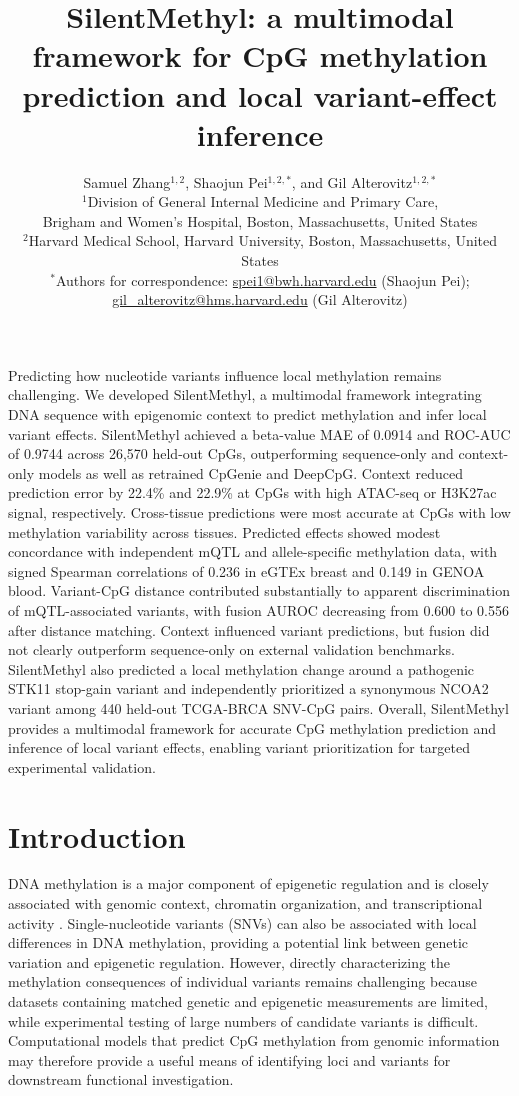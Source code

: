 \documentclass[11pt,letterpaper]{article}
\title{\LARGE\bfseries SilentMethyl: a multimodal framework for CpG methylation prediction and local variant-effect inference}
\author{%
  Samuel Zhang$^{1,2}$, Shaojun Pei$^{1,2,*}$, and Gil Alterovitz$^{1,2,*}$ \\[0.5em]
  \small $^{1}$Division of General Internal Medicine and Primary Care, \\
  \small Brigham and Women's Hospital, Boston, Massachusetts, United States \\
  \small $^{2}$Harvard Medical School, Harvard University, Boston, Massachusetts, United States \\[0.5em]
  \small $^{*}$Authors for correspondence: \href{mailto:spei1@bwh.harvard.edu}{spei1@bwh.harvard.edu} (Shaojun Pei); \\
  \small \href{mailto:gil\_alterovitz@hms.harvard.edu}{gil\_alterovitz@hms.harvard.edu} (Gil Alterovitz)
}
\date{}
\renewenvironment{abstract}{%
  \section*{\abstractname}\vspace{-0.25em}
}{\par\vspace{0.6em}}
\begin{document}
\maketitle
\begin{abstract}
Predicting how nucleotide variants influence local methylation remains challenging. We developed SilentMethyl, a multimodal framework integrating DNA sequence with epigenomic context to predict methylation and infer local variant effects. SilentMethyl achieved a beta-value MAE of 0.0914 and ROC-AUC of 0.9744 across 26,570 held-out CpGs, outperforming sequence-only and context-only models as well as retrained CpGenie and DeepCpG. Context reduced prediction error by 22.4\% and 22.9\% at CpGs with high ATAC-seq or H3K27ac signal, respectively. Cross-tissue predictions were most accurate at CpGs with low methylation variability across tissues. Predicted effects showed modest concordance with independent mQTL and allele-specific methylation data, with signed Spearman correlations of 0.236 in eGTEx breast and 0.149 in GENOA blood. Variant-CpG distance contributed substantially to apparent discrimination of mQTL-associated variants, with fusion AUROC decreasing from 0.600 to 0.556 after distance matching. Context influenced variant predictions, but fusion did not clearly outperform sequence-only on external validation benchmarks. SilentMethyl also predicted a local methylation change around a pathogenic STK11 stop-gain variant and independently prioritized a synonymous NCOA2 variant among 440 held-out TCGA-BRCA SNV-CpG pairs. Overall, SilentMethyl provides a multimodal framework for accurate CpG methylation prediction and inference of local variant effects, enabling variant prioritization for targeted experimental validation.
\end{abstract}

\section{Introduction}
DNA methylation is a major component of epigenetic regulation and is closely associated with genomic context, chromatin organization, and transcriptional activity \cite{jones2012functions,schubeler2015function}. Single-nucleotide variants (SNVs) can also be associated with local differences in DNA methylation, providing a potential link between genetic variation and epigenetic regulation. However, directly characterizing the methylation consequences of individual variants remains challenging because datasets containing matched genetic and epigenetic measurements are limited, while experimental testing of large numbers of candidate variants is difficult. Computational models that predict CpG methylation from genomic information may therefore provide a useful means of identifying loci and variants for downstream functional investigation.
\end{document}
